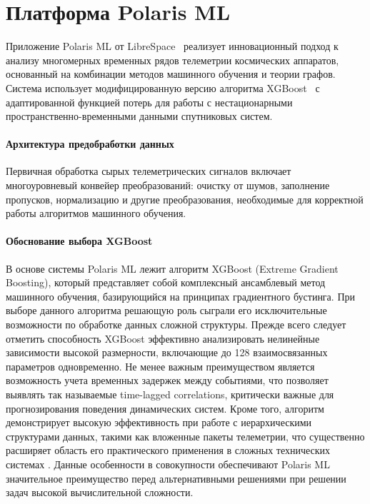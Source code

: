\chapter{Платформа Polaris ML}

Приложение Polaris ML от LibreSpace~\cite{librespace_docs} реализует
инновационный подход к анализу многомерных временных рядов телеметрии
космических аппаратов, основанный на комбинации методов машинного обучения и
теории графов. Система использует модифицированную версию алгоритма
XGBoost~\cite{xgboost_docs} с адаптированной функцией потерь для работы с
нестационарными пространственно-временными данными спутниковых систем.

\subsubsection{Архитектура предобработки данных}

Первичная обработка сырых телеметрических сигналов включает многоуровневый
конвейер преобразований: очистку от шумов, заполнение пропусков, нормализацию и
другие преобразования, необходимые для корректной работы алгоритмов машинного
обучения.

\subsubsection{Обоснование выбора XGBoost}

В основе системы Polaris ML лежит алгоритм XGBoost (Extreme Gradient Boosting),
который представляет собой комплексный ансамблевый метод машинного обучения,
базирующийся на принципах градиентного бустинга. При выборе данного алгоритма
решающую роль сыграли его исключительные возможности по обработке данных сложной
структуры. Прежде всего следует отметить способность XGBoost эффективно
анализировать нелинейные зависимости высокой размерности, включающие до 128
взаимосвязанных параметров одновременно. Не менее важным преимуществом является
возможность учета временных задержек между событиями, что позволяет выявлять так
называемые time-lagged correlations, критически важные для прогнозирования
поведения динамических систем. Кроме того, алгоритм демонстрирует высокую
эффективность при работе с иерархическими структурами данных, такими как
вложенные пакеты телеметрии, что существенно расширяет область его практического
применения в сложных технических системах \cite{luppen2021introducing}. Данные
особенности в совокупности обеспечивают Polaris ML значительное преимущество
перед альтернативными решениями при решении задач высокой вычислительной
сложности.

